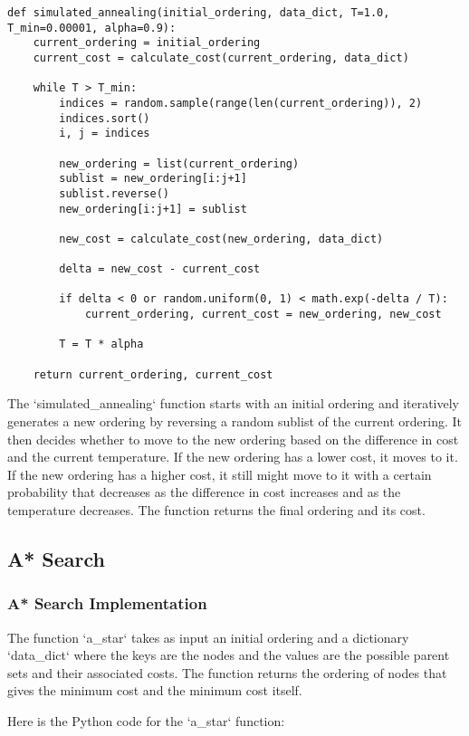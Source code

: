 \documentclass{article}
\begin{document}
\begin{verbatim}
def simulated_annealing(initial_ordering, data_dict, T=1.0, T_min=0.00001, alpha=0.9):
    current_ordering = initial_ordering
    current_cost = calculate_cost(current_ordering, data_dict)

    while T > T_min:
        indices = random.sample(range(len(current_ordering)), 2)
        indices.sort()
        i, j = indices

        new_ordering = list(current_ordering)
        sublist = new_ordering[i:j+1]
        sublist.reverse()
        new_ordering[i:j+1] = sublist

        new_cost = calculate_cost(new_ordering, data_dict)

        delta = new_cost - current_cost

        if delta < 0 or random.uniform(0, 1) < math.exp(-delta / T):
            current_ordering, current_cost = new_ordering, new_cost

        T = T * alpha

    return current_ordering, current_cost
\end{verbatim}

The `simulated\_annealing` function starts with an initial ordering and iteratively generates a new ordering by reversing a random sublist of the current ordering. It then decides whether to move to the new ordering based on the difference in cost and the current temperature. If the new ordering has a lower cost, it moves to it. If the new ordering has a higher cost, it still might move to it with a certain probability that decreases as the difference in cost increases and as the temperature decreases. The function returns the final ordering and its cost.
\subsection{A* Search}


\subsubsection{A* Search Implementation}
 The function `a\_star` takes as input an initial ordering and a dictionary `data\_dict` where the keys are the nodes and the values are the possible parent sets and their associated costs. The function returns the ordering of nodes that gives the minimum cost and the minimum cost itself.

Here is the Python code for the `a\_star` function:
\end{document}
